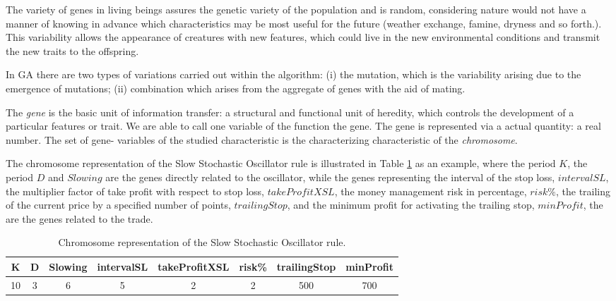 The variety of genes in living beings assures the genetic variety of the population and is random, considering nature would not have a manner of knowing in advance which characteristics may be most useful for the future (weather exchange, famine, dryness and so forth.). This variability allows the appearance of creatures with new features, which could live in the new environmental conditions and transmit the new traits to the offspring.

In GA there are two types of variations carried out within the algorithm: (i) the mutation, which is the variability arising due to the emergence of mutations; (ii) combination which arises from the aggregate of genes with the aid of mating.

The \textit{gene} is the basic unit of information transfer: a structural and functional unit of heredity, which controls the development of a particular features or trait. We are able to call one variable of the function the gene. The gene is represented via a actual quantity: a real number. The set of gene- variables of the studied characteristic is the characterizing characteristic of the \textit{chromosome}.

The chromosome representation of the  Slow Stochastic Oscillator rule is illustrated in Table \ref{tab:Chromosome} as an example, where the period $K$, the period $D$ and $Slowing$ are the genes directly related to the oscillator, while the genes representing the interval of the stop loss, $intervalSL$, the multiplier factor of take profit with respect to stop loss, $takeProfitXSL$, the money management risk in percentage, $risk\%$, the trailing of the current price by a specified number of points, $trailingStop$, and the minimum profit for activating the trailing stop, $minProfit$, the are the genes related to the trade.

\begin{center}
\begin{table}[htb]
\centering
\begin{tabular}{|c|c|c|c|c|c|c|c|}
\hline 
K & D & Slowing & intervalSL & takeProfitXSL & risk\% & trailingStop & minProfit\\ 
\hline 
10 & 3 & 6 & 5 & 2 & 2 & 500 & 700\\ 
\hline 
\end{tabular} 
\caption{\label{tab:Chromosome}Chromosome representation of the  Slow Stochastic Oscillator rule.}
\end{table}
\end{center}


